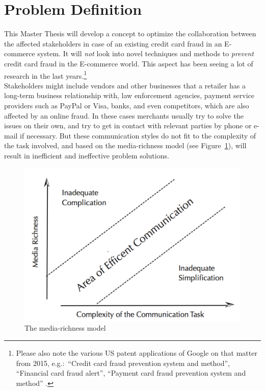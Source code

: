 
\section{Problem Definition}
\label{sec:problem_definition}

This Master Thesis will develop a concept to optimize the collaboration between the affected stakeholders in case of an existing credit card fraud in an \gls{E-commerce} system. It will \emph{not} look into novel techniques and methods to \emph{prevent} credit card fraud in the \gls{E-commerce} world. This aspect has been seeing a lot of research in the last years.\footnote{Please also note the various US patent applications of Google on that matter from 2015, e.g.:\ “Credit card fraud prevention system and method”, “Financial card fraud alert”, “Payment card fraud prevention system and method” \citep{GooglePatents2015}.} \\

Stakeholders might include vendors and other businesses that a retailer has a long-term business relationship with, law enforcement agencies, payment service providers such as PayPal or Visa, banks, and even competitors, which are also affected by an online fraud. In these cases merchants usually try to solve the issues on their own, and try to get in contact with relevant parties by phone or e-mail if necessary. But these communication styles do not fit to the complexity of the task involved, and based on the media-richness model (see Figure~\ref{fig:images_media_richness_model}), will result in inefficient and ineffective problem solutions. \\

\begin{figure}[!ht]
	\centering
		\includegraphics[width=0.9\columnwidth]{images/media-richness-model.png}
	\caption[The media-richness model]{The media-richness model \citep{Rice1992}}
\label{fig:images_media_richness_model}
\end{figure}

